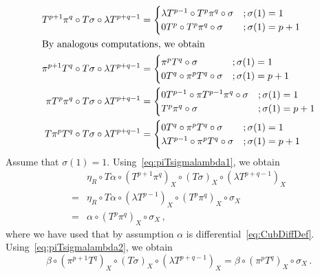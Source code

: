 \documentclass[12pt,reqno, a4paper]{amsart}
\numberwithin{equation}{section}
\theoremstyle{plain}
\theoremstyle{definition}
\theoremstyle{remark}
\newcommand{\Val}{\eta}
\begin{document}
\begin{align}
\label{eq:piTsigmalambda1}
  T^{p+1} \pi^q \circ T\sigma \circ \lambda T^{p+q-1}
  &=
  \begin{cases}
    \lambda T^{p-1} \circ T^p \pi^q \circ \sigma
    &; \sigma(1) = 1 \\
    0T^p \circ T^p \pi^q \circ \sigma
    &;  \sigma(1) = p+1
  \end{cases}
  \\
\intertext{By analogous computations, we obtain}
\label{eq:piTsigmalambda2}
  \pi^{p+1} T^q \circ T\sigma \circ \lambda T^{p+q-1}
  &=
  \begin{cases}
    \pi^p T^q \circ \sigma
    &; \sigma(1) = 1 \\
    0 T^q \circ \pi^p T^q \circ \sigma
    &;  \sigma(1) = p+1
  \end{cases}
  \\
\label{eq:piTsigmalambda3}
  \pi T^p \pi^q \circ T\sigma \circ \lambda T^{p+q-1}
  &=
  \begin{cases}
    0 T^{p-1} \circ \pi T^{p-1} \pi^q \circ \sigma
    &; \sigma(1) = 1 \\
    T^p \pi^q \circ \sigma
    &;  \sigma(1) = p+1
  \end{cases}
  \\
\label{eq:piTsigmalambda4}
  T \pi^p T^q \circ T\sigma \circ \lambda T^{p+q-1}
  &=
  \begin{cases}
    0 T^q \circ \pi^p T^q \circ \sigma
    &; \sigma(1) = 1 \\
    \lambda T^{p-1} \circ \pi^p T^q \circ \sigma
    &;  \sigma(1) = p+1
  \end{cases}
\end{align}
Assume that $\sigma(1) = 1$. Using~\eqref{eq:piTsigmalambda1}, we obtain
\begin{equation*}
\begin{split}
  &
  \Val_R \circ T\alpha \circ
  (T^{p+1} \pi^q)_X \circ (T\sigma)_X \circ (\lambda T^{p+q-1})_X
  \\
  ={}&
  \Val_R \circ T\alpha \circ (\lambda T^{p-1})_X \circ
  (T^p \pi^q)_X \circ \sigma_X
  \\
  ={}&
  \alpha \circ (T^p \pi^q)_X \circ \sigma_X
  \,,
\end{split}
\end{equation*}
where we have used that by assumption $\alpha$ is differential~\eqref{eq:CubDiffDef}. Using~\eqref{eq:piTsigmalambda2}, we obtain
\begin{equation*}
  \beta \circ
  (\pi^{p+1} T^q)_X \circ (T\sigma)_X \circ (\lambda T^{p+q-1})_X
  =
  \beta \circ (\pi^p T^q)_X \circ \sigma_X
  \,.
\end{equation*}
\end{document}
